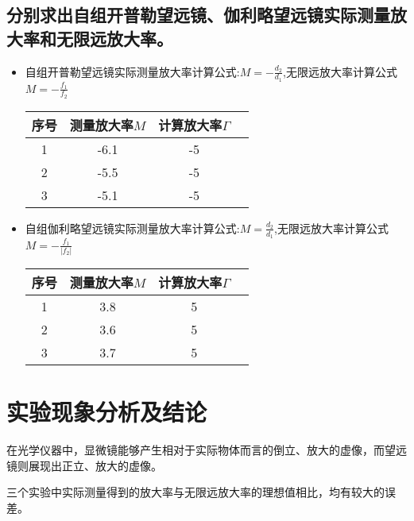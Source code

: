 \documentclass[signature=data]{physicsreport}
\begin{document}
\subsection{分别求出自组开普勒望远镜、伽利略望远镜实际测量放大率和无限远放大率。}

\begin{itemize}
    \item 自组开普勒望远镜实际测量放大率计算公式:$M=-\frac{d_2}{d_1}$,无限远放大率计算公式$M=-\frac{f_1}{f_2}$
    \begin{table}[h!]
        \centering
        \begin{tabular}{|c|c|c|c|}
        \hline
        序号  & 测量放大率$M$  & 计算放大率$\Gamma$\\
        \hline
        1 & -6.1 & -5\\
        \hline
        2 & -5.5 & -5\\
        \hline
        3 & -5.1 & -5\\
        \hline
        \end{tabular}
        \label{tab:experiment_data2}
    \end{table}

    \item 自组伽利略望远镜实际测量放大率计算公式:$M=\frac{d_2}{d_1}$,无限远放大率计算公式$M=-\frac{f_1}{|f_2|}$
    \begin{table}[h!]
        \centering
        \begin{tabular}{|c|c|c|c|}
        \hline
        序号  & 测量放大率$M$  & 计算放大率$\Gamma$\\
        \hline
        1 & 3.8 & 5\\
        \hline
        2 & 3.6 & 5\\
        \hline
        3 & 3.7 & 5\\
        \hline
        \end{tabular}
        \label{tab:experiment_data3}
    \end{table}
\end{itemize}

\newpage

\section{实验现象分析及结论}

在光学仪器中，显微镜能够产生相对于实际物体而言的倒立、放大的虚像，而望远镜则展现出正立、放大的虚像。

三个实验中实际测量得到的放大率与无限远放大率的理想值相比，均有较大的误差。
\end{document}
